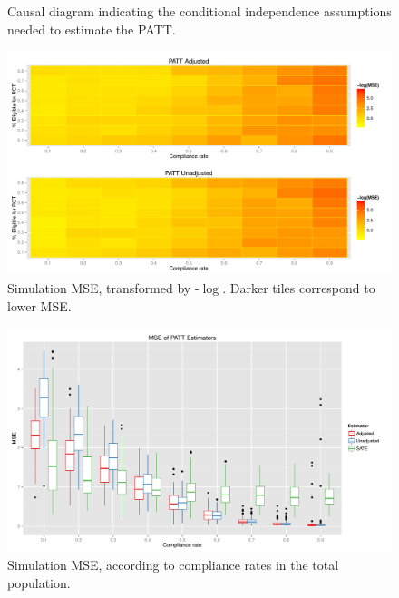 \documentclass[12pt]{article}
\begin{document}
\pagebreak
\begin{appendices}

\begin{figure}[htb]
\centering
{}
\caption{Causal diagram indicating the conditional independence assumptions needed to estimate the PATT.}\label{fig:DAG}
\end{figure}

\begin{figure}[htbp]
\begin{center}
\includegraphics[width = 1\textwidth]{mse_ratec_rates_B5}
\caption{Simulation MSE, transformed by -$\log$. Darker tiles correspond to lower MSE.}
\label{fig:sim_tiles}
\end{center}
\end{figure}

\begin{figure}[htbp]
\begin{center}
\includegraphics[width = 1\textwidth]{mse_boxplots_B5}
\caption{Simulation MSE, according to compliance rates in the total population.}
\label{fig:sim_compliance}
\end{center}
\end{figure}


\end{appendices}
\end{document}
